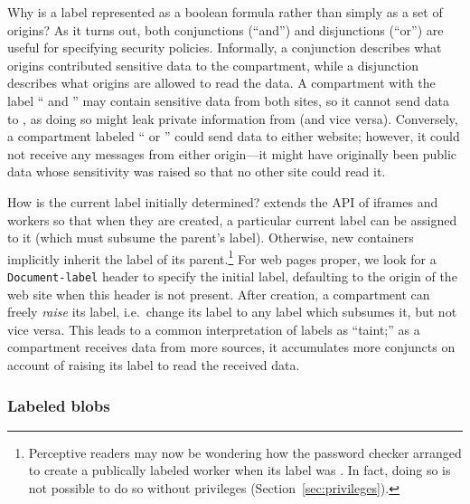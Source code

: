 %
Why is a label represented as a boolean formula rather than simply
as a set of origins?
%
As it turns out, both conjunctions (``and'')
and disjunctions (``or'') are useful for specifying security policies.
%
Informally, a conjunction describes what origins contributed sensitive data
to the compartment, while a disjunction describes what origins are allowed
to read the data.
%
A compartment with the label `` and ''
may contain sensitive data from both sites, so it cannot send data to
, as doing so might leak private information from
 (and vice versa).
%
Conversely, a compartment labeled `` or ''
could send data to either website; however, it could not receive any
messages from either origin---it might have originally been public data
whose sensitivity was raised so that no other site could read it.

How is the current label initially determined?
%
\sys{} extends the API of iframes and workers so that when they are
created, a particular current label can be assigned to it (which
must subsume the parent's label).  Otherwise, new containers implicitly
inherit the label of its parent.\footnote{Perceptive readers may now be wondering how
the password checker arranged to create a publically labeled worker
when its label was .  In fact, doing so is not possible
to do so without privileges (Section~\ref{sec:privileges}).}
%
For web pages proper, we look for a {\tt Document-label} header to
specify the initial label, defaulting to the origin of the web site when
this header is not present.
%
After creation, a compartment can freely \emph{raise} its label, i.e.\
change its label to any label which subsumes it, but not vice versa.
%
This leads to a common interpretation of labels as ``taint;'' as
a compartment receives data from more sources, it accumulates more
conjuncts on account of raising its label to read the received data.

\subsubsection{Labeled blobs}
\label{sec:labeled-blobs}

